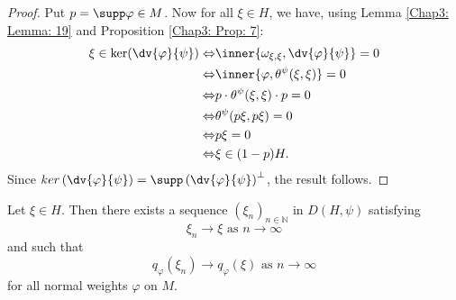 \begin{proof}
    Put $p=\supp\varphi\in M$. Now for all $\xi\in H$, we have, using Lemma \ref{Chap3: Lemma: 19} and Proposition \ref{Chap3: Prop: 7}:
    \[
        \begin{split}
            \xi\in\ker(\dv{\varphi}{\psi})\Leftrightarrow&\inner{\omega_{\xi,\xi},\dv{\varphi}{\psi}}=0\\
            \Leftrightarrow&\inner{\varphi,\theta^\psi(\xi,\xi)}=0\\
            \Leftrightarrow&p\cdot\theta^\psi(\xi,\xi)\cdot p=0\\
            \Leftrightarrow&\theta^\psi(p\xi,p\xi)=0\\
            \Leftrightarrow& p\xi=0\\
            \Leftrightarrow& \xi\in (1-p)H.
        \end{split}
    \]
    Since $ker\left( \dv{\varphi}{\psi} \right)=\supp\left( \dv{\varphi}{\psi} \right)^\perp$, the result follows.
\end{proof}
\begin{proposition}\label{Chap3: Prop: 21}
    Let $\xi\in H$. Then there exists a sequence $(\xi_n)_{n\in \mathbb{N}}$ in $D(H,\psi)$ satisfying
    \[
        \xi_n\to \xi \text{ as }n\to \infty
    \]
    and such that
    \begin{equation}\label{Chap3: Eqn: 12}
        q_\varphi(\xi_n)\to q_\varphi(\xi)\text{ as }n\to \infty
    \end{equation}
    for all normal weights $\varphi$ on $M$.
\end{proposition}
